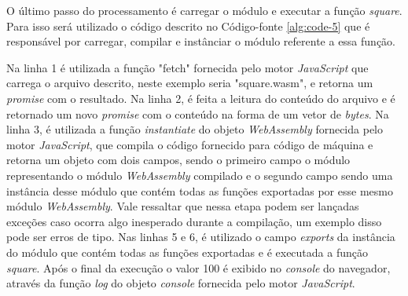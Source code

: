 O último passo do processamento é carregar o módulo e executar a função \textit{square}.
Para isso será utilizado o código descrito no Código-fonte \ref{alg:code-5} que é
responsável por carregar, compilar e instânciar o módulo referente a essa função.



Na linha 1 é utilizada a função "fetch" fornecida pelo motor \textit{JavaScript} que
carrega o arquivo descrito, neste exemplo seria "square.wasm", e retorna um
\textit{promise} com o resultado. Na linha 2, é feita a leitura do conteúdo do arquivo e
é retornado um novo \textit{promise} com o conteúdo na forma de um vetor de
\textit{bytes}. Na linha 3, é utilizada a função \textit{instantiate} do objeto
\textit{WebAssembly} fornecida pelo motor \textit{JavaScript}, que compila o código
fornecido para código de máquina e retorna um objeto com dois campos, sendo o primeiro
campo o módulo representando o módulo \textit{WebAssembly} compilado e o segundo campo
sendo uma instância desse módulo que contém todas as funções exportadas por esse mesmo
módulo \textit{WebAssembly}. Vale ressaltar que nessa etapa podem ser lançadas exceções
caso ocorra algo inesperado durante a compilação, um exemplo disso pode ser
erros de tipo. Nas linhas 5 e 6, é utilizado o campo \textit{exports} da instância do
módulo que contém todas as funções exportadas e é executada a função \textit{square}.
Após o final da execução o valor 100 é exibido no \textit{console} do navegador, através
da função \textit{log} do objeto \textit{console} fornecida pelo motor
\textit{JavaScript}.